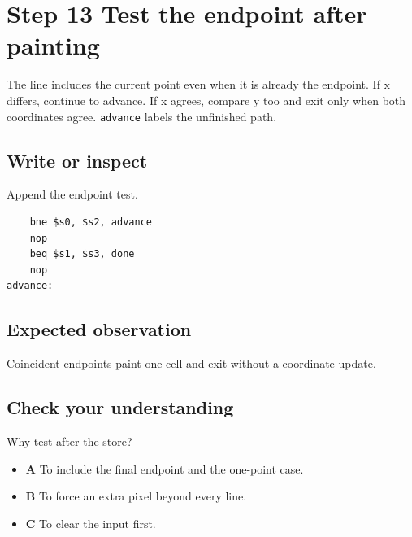 \section{Step 13 Test the endpoint after
  painting}\label{007-bresenham-line-s13-step-13-test-the-endpoint-after-painting}

The line includes the current point even when it is already the
endpoint. If x differs, continue to advance. If x agrees, compare y too
and exit only when both coordinates agree. \texttt{advance} labels the
unfinished path.

\subsection{Write or
  inspect}\label{007-bresenham-line-s13-write-or-inspect}

Append the endpoint test.

\begin{verbatim}
    bne $s0, $s2, advance
    nop
    beq $s1, $s3, done
    nop
advance:
\end{verbatim}

\subsection{Expected
  observation}\label{007-bresenham-line-s13-expected-observation}

Coincident endpoints paint one cell and exit without a coordinate
update.

\subsection{Check your
  understanding}\label{007-bresenham-line-s13-check-your-understanding}

Why test after the store?

\begin{itemize}
  \tightlist
  \item
        \textbf{A} To include the final endpoint and the one-point case.
  \item
        \textbf{B} To force an extra pixel beyond every line.
  \item
        \textbf{C} To clear the input first.
\end{itemize}
